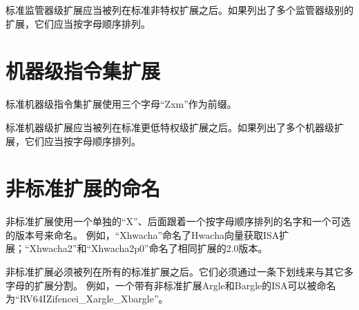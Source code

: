标准监管器级扩展应当被列在标准非特权扩展之后。如果列出了多个监管器级别的扩展，它们应当按字母顺序排列。

\section{机器级指令集扩展}

标准机器级指令集扩展使用三个字母“Zxm”作为前缀。

标准机器级扩展应当被列在标准更低特权级扩展之后。如果列出了多个机器级扩展，它们应当按字母顺序排列。

\section{非标准扩展的命名}

非标准扩展使用一个单独的“X”、后面跟着一个按字母顺序排列的名字和一个可选的版本号来命名。
例如，“Xhwacha”命名了Hwacha向量获取ISA扩展；“Xhwacha2”和“Xhwacha2p0”命名了相同扩展的2.0版本。

非标准扩展必须被列在所有的标准扩展之后。它们必须通过一条下划线来与其它多字母的扩展分割。
例如，一个带有非标准扩展Argle和Bargle的ISA可以被命名为“RV64IZifencei\_Xargle\_Xbargle”。

